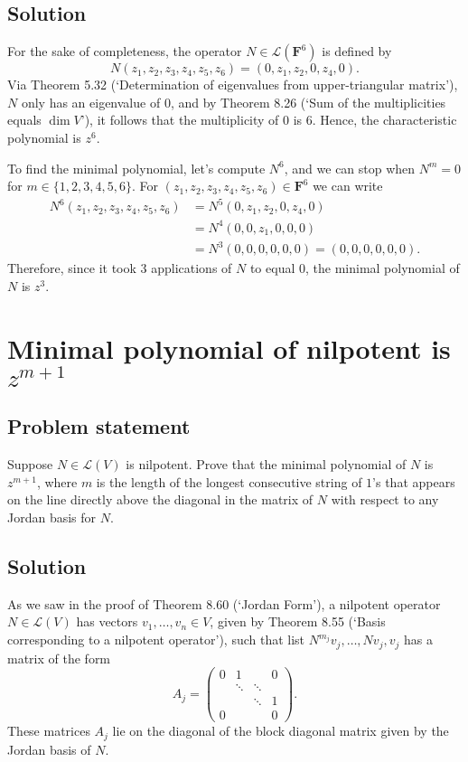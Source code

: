 \documentclass{article}
\begin{document}
\subsection*{Solution}
For the sake of completeness, the operator $N\in\mathcal{L}(\mathbf{F}^6)$ is defined by
\[N(z_1,z_2,z_3,z_4,z_5,z_6)=(0,z_1,z_2,0,z_4,0).\]
Via Theorem 5.32 (`Determination of eigenvalues from upper-triangular matrix'), $N$ only has an eigenvalue of $0$, and by Theorem 8.26 (`Sum of the multiplicities equals $\operatorname{dim}V$'), it follows that the multiplicity of $0$ is $6$. 
Hence, the characteristic polynomial is $z^6$.

To find the minimal polynomial, let's compute $N^6$, and we can stop when $N^m=0$ for $m\in\{1,2,3,4,5,6\}$. 
For $(z_1,z_2,z_3,z_4,z_5,z_6)\in\mathbf{F}^6$ we can write
\begin{align*}
    N^6(z_1,z_2,z_3,z_4,z_5,z_6)&=N^5(0,z_1,z_2,0,z_4,0)\\
    &=N^4(0,0,z_1,0,0,0)\\
    &=N^3(0,0,0,0,0,0)=(0,0,0,0,0,0).
\end{align*}
Therefore, since it took 3 applications of $N$ to equal $0$, the minimal polynomial of $N$ is $z^3$.

\clearpage

\section{Minimal polynomial of nilpotent is $z^{m+1}$}
\subsection*{Problem statement}
Suppose $N\in\mathcal{L}(V)$ is nilpotent. Prove that the minimal polynomial of $N$ is $z^{m+1}$, where $m$ is the length of the longest consecutive string of $1$'s that appears on the line directly above the diagonal in the matrix of $N$ with respect to any Jordan basis for $N$.

\subsection*{Solution}
As we saw in the proof of Theorem 8.60 (`Jordan Form'), a nilpotent operator $N\in\mathcal{L}(V)$ has vectors $v_1,\ldots,v_n\in V$, given by Theorem 8.55 (`Basis corresponding to a nilpotent operator'), such that list $N^{m_j}v_j,\ldots,Nv_j,v_j$ has a matrix of the form
\begin{equation*}
A_j=\begin{pmatrix}
0 & 1 &  & 0\\
 & \ddots & \ddots & \\
 &  & \ddots & 1\\
0 &  &  & 0
\end{pmatrix}.
\end{equation*}
These matrices $A_j$ lie on the diagonal of the block diagonal matrix given by the Jordan basis of $N$.
\end{document}
